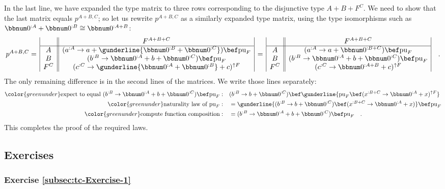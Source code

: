 In the last line, we have expanded the type matrix to three rows corresponding
to the disjunctive type $A+B+F^{C}$. We need to show that the last
matrix equals $p^{A+B,C}$; so let us rewrite $p^{A+B,C}$ as a similarly
expanded type matrix, using the type isomorphisms such as $\bbnum 0^{:A}+\bbnum 0^{:B}\cong\bbnum 0^{:A+B}$:
\[
p^{A+B,C}=\,\begin{array}{|c||c|}
 & F^{A+B+C}\\
\hline A & (a^{:A}\rightarrow a+\gunderline{\bbnum 0^{:B}+\bbnum 0^{:C}})\bef\text{pu}_{F}\\
B & (b^{:B}\rightarrow\bbnum 0^{:A}+b+\bbnum 0^{:C})\bef\text{pu}_{F}\\
F^{C} & (c^{:C}\rightarrow\gunderline{\bbnum 0^{:A}+\bbnum 0^{:B}}+c)^{\uparrow F}
\end{array}\,=\,\begin{array}{|c||c|}
 & F^{A+B+C}\\
\hline A & (a^{:A}\rightarrow a+\bbnum 0^{:B+C})\bef\text{pu}_{F}\\
B & (b^{:B}\rightarrow\bbnum 0^{:A}+b+\bbnum 0^{:C})\bef\text{pu}_{F}\\
F^{C} & (c^{:C}\rightarrow\bbnum 0^{:A+B}+c)^{\uparrow F}
\end{array}\quad.
\]
The only remaining difference is in the second lines of the matrices.
We write those lines separately: 
\begin{align*}
{\color{greenunder}\text{expect to equal }(b^{:B}\rightarrow\bbnum 0^{:A}+b+\bbnum 0^{:C})\bef\text{pu}_{F}:}\quad & (b^{:B}\rightarrow b+\bbnum 0^{:C})\bef\gunderline{\text{pu}_{F}\bef(x^{:B+C}\rightarrow\bbnum 0^{:A}+x)^{\uparrow F}}\\
{\color{greenunder}\text{naturality law of }\text{pu}_{F}:}\quad & =\gunderline{(b^{:B}\rightarrow b+\bbnum 0^{:C})\bef(x^{:B+C}\rightarrow\bbnum 0^{:A}+x)}\bef\text{pu}_{F}\\
{\color{greenunder}\text{compute function composition}:}\quad & =(b^{:B}\rightarrow\bbnum 0^{:A}+b+\bbnum 0^{:C})\bef\text{pu}_{F}\quad.
\end{align*}
This completes the proof of the required laws.

\subsection{Exercises}

\subsubsection{Exercise \label{subsec:tc-Exercise-1}\ref{subsec:tc-Exercise-1}}

